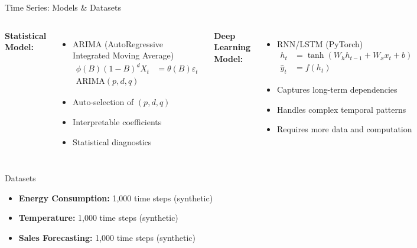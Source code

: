 \documentclass[aspectratio=169,10pt]{beamer}
\begin{document}
\begin{frame}{Time Series: Models \& Datasets}
\begin{columns}
\textcolor{statcolor}{\textbf{Statistical Model:}}
\begin{itemize}
    \item ARIMA (AutoRegressive Integrated Moving Average)
    \begin{align*}
    \phi(B)(1-B)^d X_t &= \theta(B)\varepsilon_t \\
    \text{ARIMA}(p,d,q)
    \end{align*}
    \item Auto-selection of $(p,d,q)$
    \item Interpretable coefficients
    \item Statistical diagnostics
\end{itemize}

\textcolor{dlcolor}{\textbf{Deep Learning Model:}}
\begin{itemize}
    \item RNN/LSTM (PyTorch)
    \begin{align*}
    h_t &= \tanh(W_h h_{t-1} + W_x x_t + b) \\
    \hat{y}_t &= f(h_t)
    \end{align*}
    \item Captures long-term dependencies
    \item Handles complex temporal patterns
    \item Requires more data and computation
\end{itemize}
\end{columns}

\vspace{0.5cm}

\begin{block}{Datasets}
\begin{itemize}
    \item \textbf{Energy Consumption:} 1,000 time steps (synthetic)
    \item \textbf{Temperature:} 1,000 time steps (synthetic)
    \item \textbf{Sales Forecasting:} 1,000 time steps (synthetic)
\end{itemize}
\end{block}
\end{frame}
\end{document}
